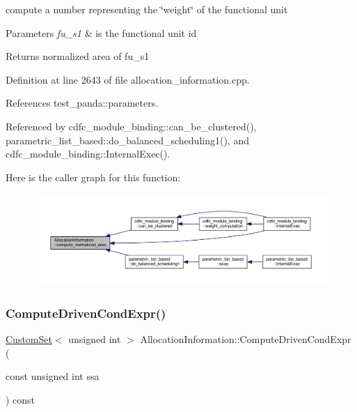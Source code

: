 compute a number representing the \char`\"{}weight\char`\"{} of the functional unit 


\begin{DoxyParams}{Parameters}
{\em fu\+\_\+s1} & is the functional unit id \\
\hline
\end{DoxyParams}
\begin{DoxyReturn}{Returns}
normalized area of fu\+\_\+s1 
\end{DoxyReturn}


Definition at line 2643 of file allocation\+\_\+information.\+cpp.



References test\+\_\+panda\+::parameters.



Referenced by cdfc\+\_\+module\+\_\+binding\+::can\+\_\+be\+\_\+clustered(), parametric\+\_\+list\+\_\+based\+::do\+\_\+balanced\+\_\+scheduling1(), and cdfc\+\_\+module\+\_\+binding\+::\+Internal\+Exec().

Here is the caller graph for this function\+:
\nopagebreak
\begin{figure}[H]
\begin{center}
\leavevmode
\includegraphics[width=350pt]{d7/d79/classAllocationInformation_a5d67bf413b140779cce7e5d1121db521_icgraph}
\end{center}
\end{figure}
\mbox{\label{classAllocationInformation_a13b0654b7ba98c1ccb0ca4926778de42}} 
\subsubsection{\texorpdfstring{Compute\+Driven\+Cond\+Expr()}{ComputeDrivenCondExpr()}}
{\footnotesize\ttfamily \hyperlink{custom__set_8hpp_a615bc2f42fc38a4bb1790d12c759e86f}{Custom\+Set}$<$ unsigned int $>$ Allocation\+Information\+::\+Compute\+Driven\+Cond\+Expr (\begin{DoxyParamCaption}\item[{const unsigned int}]{ssa }\end{DoxyParamCaption}) const\hspace{0.3cm}{\ttfamily [private]}}



